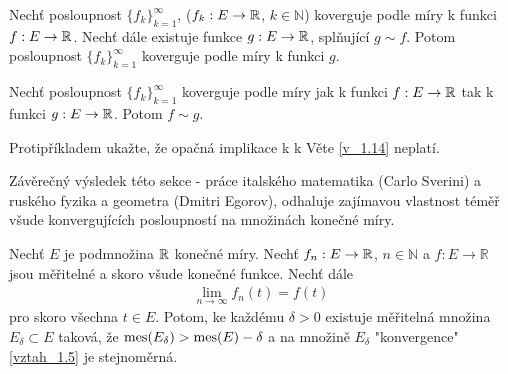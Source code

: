 \begin{theorem}
Nechť posloupnost $\{f_k\}_{k=1}^{\infty}$, ($f_k:E \to \mathbb{R}$, $k \in \mathbb{N}$) koverguje podle míry k funkci $f:E \to \mathbb{R}$.
Nechť dále existuje funkce $g:E \to \mathbb{R}$, splňující $g \sim f$. Potom posloupnost $\{f_k\}_{k=1}^{\infty}$ koverguje podle míry k funkci $g$.
\end{theorem}

\begin{theorem}
Nechť posloupnost $\{f_k\}_{k=1}^{\infty}$ koverguje podle míry jak k funkci $f:E \to \mathbb{R}$ tak k funkci $g:E \to \mathbb{R}$. 
Potom $f \sim g$.
\label{v_1.14}
\end{theorem}

\begin{uloha}
Protipříkladem ukažte, že opačná implikace k k Věte \ref{v_1.14} neplatí.
\end{uloha}




Závěrečný výsledek této sekce -  práce italského matematika (Carlo Sverini) a ruského fyzika a geometra (Dmitri Egorov), odhaluje zajímavou vlastnost téměř všude konvergujících posloupností na množinách konečné míry.

\begin{theorem}
\label{v_1.18_Egorov}
Nechť $E$ je podmnožina $\mathbb{R}$ konečné míry. Nechť $f_n:E \to \mathbb{R}$, $n \in \mathbb{N}$ a $f:E \to \mathbb{R}$ jsou měřitelné a skoro všude konečné funkce. 
Nechť dále 
\begin{align}
\lim \limits _{n \to \infty} f_n(t)  = f(t)
\label{vztah_1.5}
\end{align}
pro skoro všechna $t \in E$. Potom, ke každému $\delta > 0$ existuje měřitelná množina $E_{\delta} \subset E$ taková, že $\operatorname{mes} (E_{\delta}) > \operatorname{mes} (E) - \delta$ a na množině $E_{\delta}$ "konvergence" \eqref{vztah_1.5} je stejnoměrná.
\end{theorem}

